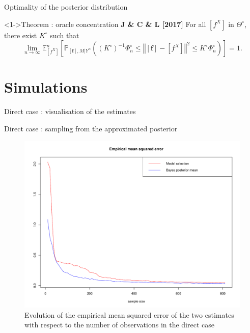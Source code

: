 \documentclass[10pt]{beamer}
\begin{document}
\begin{frame}{Optimality of the posterior distribution}
\begin{block}<1->{Theorem : oracle concentration \textbf{J \& C \& L [2017]}}
For all $\left[f^{X}\right]$ in $\Theta^{\circ}$, there exist $K^{\circ}$ such that
	\[\lim\limits_{n \rightarrow \infty} \mathbb{E}_{\left[f^{X}\right]}^{n}\left[\mathbb{P}_{\left[\boldsymbol{f}\right], M \vert Y^{n}}\left(\left(K^{\circ}\right)^{-1} \Phi_{n}^{\circ} \leq \left\Vert \left[\boldsymbol{f}\right] - \left[f^{X}\right] \right\Vert^{2} \leq K^{\circ} \Phi_{n}^{\circ} \right)\right] = 1.\]
\end{block}
\end{frame}

\section{Simulations}
\begin{frame}{Direct case : visualisation of the estimates}
\begin{center}
\end{center}
\end{frame}

\begin{frame}{Direct case : sampling from the approximated posterior}
\begin{figure}
\centering
 \includegraphics[width=.75\linewidth]{EQMdirect.pdf}
\caption{Evolution of the empirical mean squared error of the two estimates with respect to the number of observations in the direct case}\label{M}
\end{figure}
\end{frame}
\end{document}
